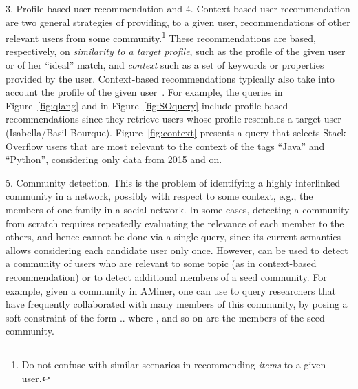 \textsf{3. Profile-based user recommendation} and \textsf{4. Context-based user recommendation} are two general strategies of providing, to a given user, recommendations of other relevant users from some community.\footnote{Do not confuse with similar scenarios in recommending \emph{items} to a given user.} These recommendations are based, respectively, on \emph{similarity to a target profile}, such as the profile of the given user or of her ``ideal'' match, and \emph{context} such as a set of keywords or properties provided by the user. Context-based recommendations typically also take into account the profile of the given user~\cite{dinoia2012linked,mavridis2015skill}. For example, the queries in Figure~\ref{fig:qlang} and in Figure~\ref{fig:SOquery} include profile-based recommendations since they retrieve users whose profile resembles a target user (Isabella/Basil Bourque). Figure~\ref{fig:context} presents a query that selects Stack Overflow users that are most relevant to the context of the tags ``Java'' and ``Python'', considering only data from 2015 and on.  






\textsf{5. Community detection.} This is the problem of identifying a highly interlinked community in a network, possibly with respect to some context, e.g., the members of one family in a social network.
In some cases, detecting a community from scratch requires repeatedly evaluating the relevance of each member to the others, and hence cannot be done via a single \qlang{} query, since its current semantics allows considering each candidate user only once. However, \qlang{} can be used to detect a community of users who are relevant to some topic (as in context-based recommendation) or to detect additional members of a seed community. For example, given a community in AMiner, one can use \qlang{} to query researchers that have frequently collaborated with many members of this community, by posing a soft constraint of the form .. where ,  and so on are the members of the seed community. 

